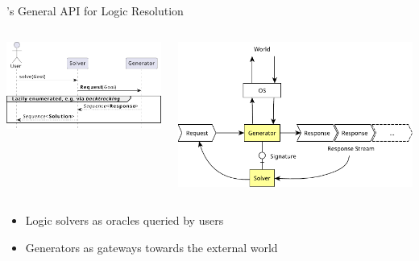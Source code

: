 \documentclass[presentation]{beamer}\mode<presentation>{\usetheme{AMSBolognaFC}}
\begin{document}
\begin{frame}{\twopkt{}'s General API for Logic Resolution}

    \begin{columns}
        \begin{column}{.49\linewidth}
            \includegraphics[width=\linewidth]{figures/primitive-usage.pdf}
        \end{column}
        \begin{column}{.49\linewidth}
            \includegraphics[width=\linewidth]{figures/generator.pdf}
        \end{column}
    \end{columns}

    \vfill

    \begin{itemize}
        \item Logic solvers as \alert{oracles} queried by users
        
        \vfill

        \item Generators as \alert{gateways} towards the external world
    \end{itemize}
\end{frame}
\end{document}
